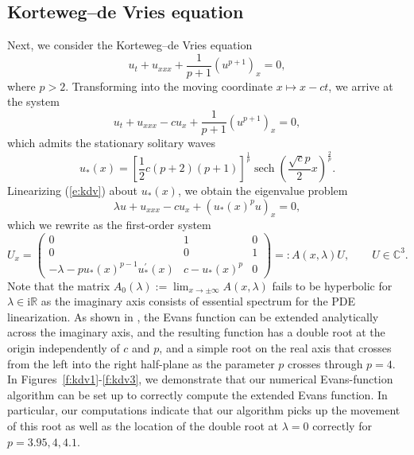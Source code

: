\documentclass[10pt]{article}
\numberwithin{equation}{section}
\def\sech{\mathop\mathrm{sech}\nolimits}
\newcommand{\C}{\mathbb{C}}
\newcommand{\R}{\mathbb{R}}
\newcommand{\rmi}{\mathrm{i}}
\begin{document}

\subsection{Korteweg--de Vries equation}\label{s:kdv}

Next, we consider the Korteweg--de Vries equation
\[
u_t + u_{xxx} + \frac{1}{p+1} (u^{p+1})_x = 0,
\]
where $p>2$. Transforming into the moving coordinate $x\mapsto x-ct$, we arrive at the system
\begin{equation}\label{e:kdv}
u_t + u_{xxx} - cu_x + \frac{1}{p+1} (u^{p+1})_x = 0,
\end{equation}
which admits the stationary solitary waves
\[
u_*(x) = \left[\frac{1}{2}c(p+2)(p+1)\right]^{\frac{1}{p}} \sech\left(\frac{\sqrt{c}p}{2}x\right)^{\frac{2}{p}}.
\]
Linearizing (\ref{e:kdv}) about $u_*(x)$, we obtain the eigenvalue problem
\begin{equation}\label{e:kdepde}
\lambda u + u_{xxx} - cu_x + (u_*(x)^p u)_x = 0,
\end{equation}
which we rewrite as the first-order system
\begin{equation}\label{e:kdvode}
U_x = \begin{pmatrix} 0 & 1 & 0 \\ 0 & 0 & 1 \\ -\lambda - pu_*(x)^{p-1}u_*^\prime(x) & c-u_*(x)^p & 0 \end{pmatrix}
=: A(x,\lambda) U, \qquad U\in\C^3.
\end{equation}
Note that the matrix $A_0(\lambda):=\lim_{x\to\pm\infty}A(x,\lambda)$ fails to be hyperbolic for $\lambda\in\rmi\R$ as the imaginary axis consists of essential spectrum for the PDE linearization. As shown in \citep{BDG,PW}, the Evans function can be extended analytically across the imaginary axis, and the resulting function has a double root at the origin independently of $c$ and $p$, and a simple root on the real axis that crosses from the left into the right half-plane as the parameter $p$ crosses through $p=4$. In Figures~\ref{f:kdv1}-\ref{f:kdv3}, we demonstrate that our numerical Evans-function algorithm can be set up to correctly compute the extended Evans function. In particular, our computations indicate that our algorithm picks up the movement of this root as well as the location of the double root at $\lambda=0$ correctly for $p=3.95,4,4.1$.
\end{document}
